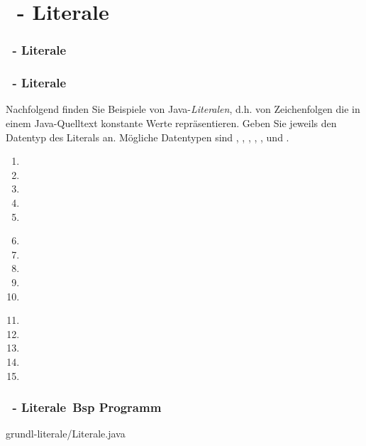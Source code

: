 \def\stitle{\theexercise\ - Literale}
\section{\stitle}
\begin{frame}%
  \frametitle{\stitle}%
\tableofcontents[current]
\end{frame}

\begin{frame}[fragile]%
  \frametitle{\stitle}%


Nachfolgend finden Sie Beispiele von Java-\emph{Literalen}, d.h. von Zeichenfolgen die in einem Java-Quelltext konstante Werte repräsentieren.
Geben Sie jeweils den Datentyp des Literals an.
Mögliche Datentypen sind , , , , ,  und .

\begin{center}

\begin{minipage}{0.3\textwidth}
\begin{enumerate}
\item {}
\item {}
\item {}
\item {}
\item {}
\end{enumerate}
\end{minipage}
\hfill
\begin{minipage}{0.3\textwidth}
\begin{enumerate}
\setcounter{enumi}{5}
\item {}
\item {}
\item {}
\item {}
\item {}
\end{enumerate}
\end{minipage}
\hfill
\begin{minipage}{0.3\textwidth}
\begin{enumerate}
\setcounter{enumi}{10}
\item {}
\item {}
\item {}
\item {}
\item {}
\end{enumerate}
\end{minipage}

\end{center}
\end{frame}


\begin{frame}[t]%
  \frametitle{\stitle\, Bsp Programm}%


{grundl-literale/Literale.java}
\end{frame}
